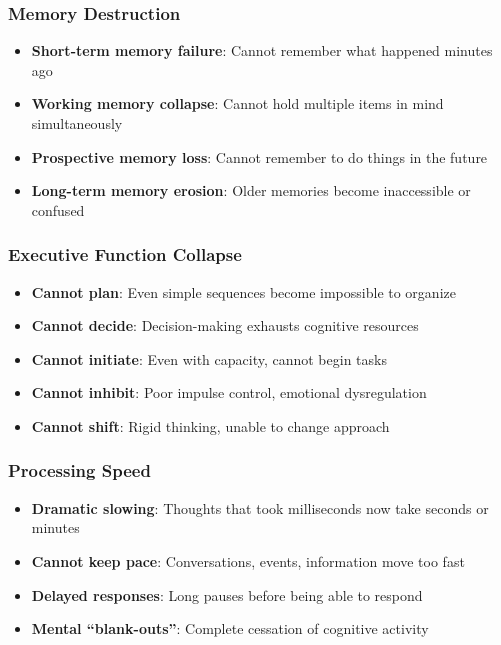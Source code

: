 \subsubsection{Memory Destruction}

\begin{itemize}
    \item \textbf{Short-term memory failure}: Cannot remember what happened minutes ago
    \item \textbf{Working memory collapse}: Cannot hold multiple items in mind simultaneously
    \item \textbf{Prospective memory loss}: Cannot remember to do things in the future
    \item \textbf{Long-term memory erosion}: Older memories become inaccessible or confused
\end{itemize}

\subsubsection{Executive Function Collapse}

\begin{itemize}
    \item \textbf{Cannot plan}: Even simple sequences become impossible to organize
    \item \textbf{Cannot decide}: Decision-making exhausts cognitive resources
    \item \textbf{Cannot initiate}: Even with capacity, cannot begin tasks
    \item \textbf{Cannot inhibit}: Poor impulse control, emotional dysregulation
    \item \textbf{Cannot shift}: Rigid thinking, unable to change approach
\end{itemize}

\subsubsection{Processing Speed}

\begin{itemize}
    \item \textbf{Dramatic slowing}: Thoughts that took milliseconds now take seconds or minutes
    \item \textbf{Cannot keep pace}: Conversations, events, information move too fast
    \item \textbf{Delayed responses}: Long pauses before being able to respond
    \item \textbf{Mental ``blank-outs''}: Complete cessation of cognitive activity
\end{itemize}

